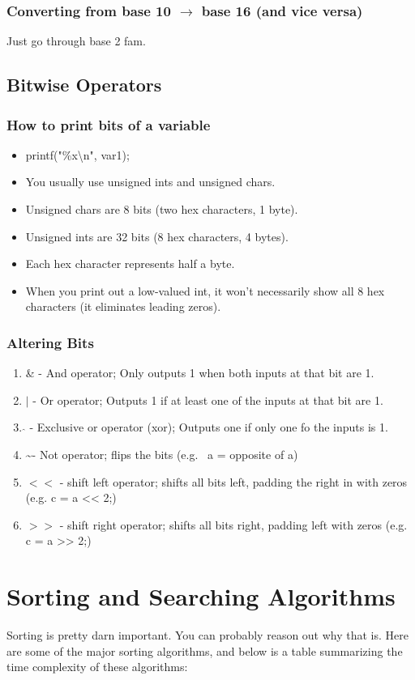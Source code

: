 \documentclass[a4paper,12pt]{report}
\begin{document}
\subsection{Converting from base 10 $\to$ base 16 (and vice versa)}
Just go through base 2 fam.

\section{Bitwise Operators}
\subsection{How to print bits of a variable}
\begin{itemize}
\item printf("\%x\textbackslash n", var1);
\item You usually use unsigned ints and unsigned chars.
\item Unsigned chars are 8 bits (two hex characters, 1 byte). 
\item Unsigned ints are 32 bits (8 hex characters, 4 bytes).  
\item Each hex character represents half a byte.
\item When you print out a low-valued int, it won't necessarily show all 8 hex characters (it eliminates leading zeros).
\end{itemize}

\subsection{Altering Bits}
\begin{enumerate}
\item \& - And operator; Only outputs 1 when both inputs at that bit are 1.
\item $|$ - Or operator; Outputs 1 if at least one of the inputs at that bit are 1. 
\item $\hat{}$ - Exclusive or operator (xor); Outputs one if only one fo the inputs is 1. 
\item \textasciitilde - Not operator; flips the bits (e.g. ~a = opposite of a)
\item $<<$ - shift left operator; shifts all bits left, padding the right in with zeros (e.g. c = a << 2;)
\item $>>$ - shift right operator; shifts all bits right, padding left with zeros (e.g. c = a >> 2;)
\end{enumerate}

\chapter{Sorting and Searching Algorithms}
Sorting is pretty darn important. You can probably reason out why that is. Here are some of the major sorting algorithms, and below is a table summarizing the time complexity of these algorithms: 
\end{document}
